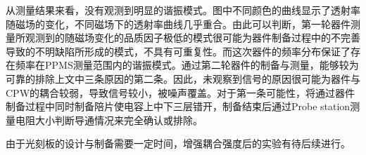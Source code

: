             从测量结果来看，没有观测到明显的谐振模式。图中不同颜色的曲线显示了透射率随磁场的变化，不同磁场下的透射率曲线几乎重合。由此可以判断，第一轮器件测量所观测到的随磁场变化的品质因子极低的模式很可能为器件制备过程中的不完善导致的不明缺陷所形成的模式，不具有可重复性。而这次器件的频率分布保证了存在频率在PPMS测量范围内的谐振模式。通过第二轮器件的制备与测量，能够较为可靠的排除上文中三条原因的第二条。因此，未观察到信号的原因很可能为器件与CPW的耦合较弱，导致信号较小，被噪声覆盖。对于第一条可能性，将通过器件制备过程中同时制备陪片使电容上中下三层错开，制备结束后通过Probe station测量电阻大小判断导通情况来完全确认或排除。

            由于光刻板的设计与制备需要一定时间，增强耦合强度后的实验有待后续进行。







